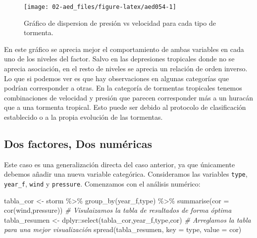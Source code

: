 \documentclass[
]{book}
\newenvironment{Shaded}{\begin{snugshade}}{\end{snugshade}}
\newcommand{\AttributeTok}[1]{\textcolor[rgb]{0.77,0.63,0.00}{#1}}
\newcommand{\CommentTok}[1]{\textcolor[rgb]{0.56,0.35,0.01}{\textit{#1}}}
\newcommand{\FunctionTok}[1]{\textcolor[rgb]{0.00,0.00,0.00}{#1}}
\newcommand{\NormalTok}[1]{#1}
\newcommand{\OtherTok}[1]{\textcolor[rgb]{0.56,0.35,0.01}{#1}}
\newcommand{\SpecialCharTok}[1]{\textcolor[rgb]{0.00,0.00,0.00}{#1}}
\begin{document}
\begin{figure}

{\centering \texttt{[image: 02-aed\_files/figure-latex/aed054-1]} 

}

\caption{Gráfico de dispersion de presión vs velocidad para cada tipo de tormenta.}\label{fig:aed054}
\end{figure}

En este gráfico se aprecia mejor el comportamiento de ambas variables en cada uno de los niveles del factor. Salvo en las depresiones tropicales donde no se aprecia asociación, en el resto de niveles se aprecia un relación de orden inverso. Lo que si podemos ver es que hay observaciones en algunas categorías que podrían corresponder a otras. En la categoría de tormentas tropicales tenemos combinaciones de velocidad y presión que parecen corresponder más a un huracán que a una tormenta tropical. Esto puede ser debido al protocolo de clasificación establecido o a la propia evolución de las tormentas.

\hypertarget{dos-factores-dos-numuxe9ricas}{%
\subsection{Dos factores, Dos numéricas}\label{dos-factores-dos-numuxe9ricas}}

Este caso es una generalización directa del caso anterior, ya que únicamente debemos añadir una nueva variable categórica. Consideramos las variables \texttt{type}, \texttt{year\_f}, \texttt{wind} y \texttt{pressure}. Comenzamos con el análisis numérico:

\begin{Shaded}
\begin{Highlighting}[]
\NormalTok{tabla\_cor }\OtherTok{\textless{}{-}}\NormalTok{ storm }\SpecialCharTok{\%\textgreater{}\%} 
  \FunctionTok{group\_by}\NormalTok{(year\_f,type) }\SpecialCharTok{\%\textgreater{}\%} 
  \FunctionTok{summarise}\NormalTok{(}\AttributeTok{cor =} \FunctionTok{cor}\NormalTok{(wind,pressure))}
\CommentTok{\# Visulaizamos la tabla de resultados de forma óptima}
\NormalTok{tabla\_resumen }\OtherTok{\textless{}{-}}\NormalTok{ dplyr}\SpecialCharTok{::}\FunctionTok{select}\NormalTok{(tabla\_cor,year\_f,type,cor)}
\CommentTok{\# Arreglamos la tabla para una mejor visualización}
\FunctionTok{spread}\NormalTok{(tabla\_resumen, }\AttributeTok{key =}\NormalTok{ type, }\AttributeTok{value =}\NormalTok{ cor)}
\end{Highlighting}
\end{Shaded}
\end{document}
